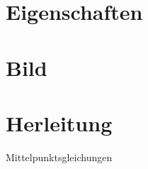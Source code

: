\setcounter{section}{0}
\section{Eigenschaften}
\section{Bild}
\section{Herleitung}
Mittelpunktsgleichungen
